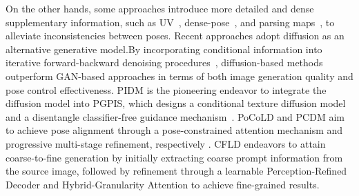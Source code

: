 On the other hands, some approaches introduce more detailed and dense supplementary information, such as UV~\cite{sarkar2021style}, dense-pose~\cite{han2023controllable}, and parsing maps~\cite{men2020controllable,zhang2021pise,zhou2022cross,lv2021learning}, to alleviate inconsistencies between poses. 
Recent approaches adopt diffusion as an alternative generative model\cite{bhunia2023person,shen2024advancing,lu2024coarse,han2023controllable}.By incorporating conditional information into iterative forward-backward denoising procedures~\cite{ho2020denoising}, diffusion-based methods outperform GAN-based approaches in terms of both image generation quality and pose control effectiveness.
PIDM is the pioneering endeavor to integrate the diffusion model into PGPIS, which designs a conditional texture diffusion model and a disentangle classifier-free guidance mechanism~\cite{ho2022classifier}. 
PoCoLD and PCDM aim to achieve pose alignment through a pose-constrained attention mechanism and progressive multi-stage refinement, respectively \cite{han2023controllable,shen2024advancing}.
CFLD \cite{lu2024coarse} endeavors to attain coarse-to-fine generation by initially extracting coarse prompt information from the source image, followed by refinement through a learnable Perception-Refined Decoder and Hybrid-Granularity Attention to achieve fine-grained results. 
%


